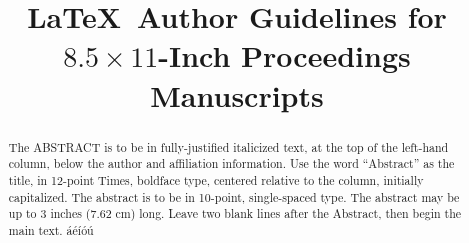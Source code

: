 \documentclass[times, 10pt,twocolumn]{article}
\begin{document}
\title{\LaTeX\ Author Guidelines 
       for {\boldmath $8.5 \times 11$-Inch} Proceedings Manuscripts}

\maketitle
\thispagestyle{empty}

\begin{abstract}
   The ABSTRACT is to be in fully-justified italicized text, at the top 
   of the left-hand column, below the author and affiliation 
   information. Use the word ``Abstract'' as the title, in 12-point 
   Times, boldface type, centered relative to the column, initially 
   capitalized. The abstract is to be in 10-point, single-spaced type. 
   The abstract may be up to 3 inches (7.62 cm) long. Leave two blank 
   lines after the Abstract, then begin the main text.
   áéíóú
\end{abstract}










\nocite{ex1,ex2}


\end{document}
